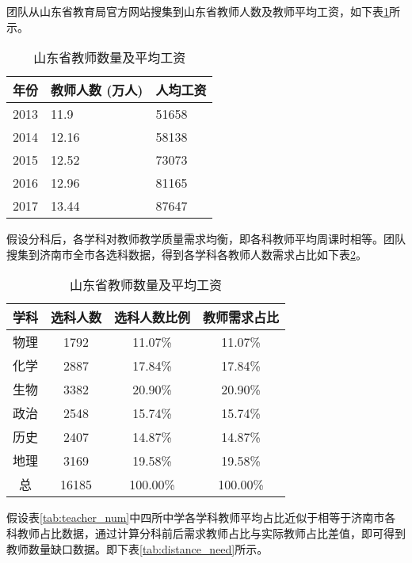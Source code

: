 \documentclass[bwprint]{cumcmthesis}
\begin{document}
团队从山东省教育局官方网站搜集到山东省教师人数及教师平均工资，如下表\ref{tab:teacher_income}所示。
\newpage
\begin{longtable}{p{3cm}p{4cm}p{3cm}}
	\caption{\label{tab:teacher_income}山东省教师数量及平均工资}\\
	\toprule
	\multicolumn{1}{l}{年份} & \multicolumn{1}{l}{教师人数 (万人)} & \multicolumn{1}{l}{人均工资} \\
	\midrule
	2013  & 11.9  & 51658 \\
	2014  & 12.16 & 58138 \\
	2015  & 12.52 & 73073 \\
	2016  & 12.96 & 81165 \\
	2017  & 13.44 & 87647 \\
	\bottomrule
\end{longtable}%


假设分科后，各学科对教师教学质量需求均衡，即各科教师平均周课时相等。团队搜集到济南市全市各选科数据，得到各学科各教师人数需求占比如下表\ref{tab:after_teacher_need}。

\begin{longtable}{cccc}
	\caption{\label{tab:after_teacher_need}山东省教师数量及平均工资}\\
	\toprule
	学科    & 选科人数  & 选科人数比例 & 教师需求占比 \\
	\midrule
	物理    & 1792  & 11.07\% & 11.07\% \\
	化学    & 2887  & 17.84\% & 17.84\% \\
	生物    & 3382  & 20.90\% & 20.90\% \\
	政治    & 2548  & 15.74\% & 15.74\% \\
	历史    & 2407  & 14.87\% & 14.87\% \\
	地理    & 3169  & 19.58\% & 19.58\% \\
	\midrule
	总     & 16185 & 100.00\% & 100.00\% \\
	\bottomrule
\end{longtable}%


假设表\ref{tab:teacher_num}中四所中学各学科教师平均占比近似于相等于济南市各科教师占比数据，通过计算分科前后需求教师占比与实际教师占比差值，即可得到教师数量缺口数据。即下表\ref{tab:distance_need}所示。
\end{document}

